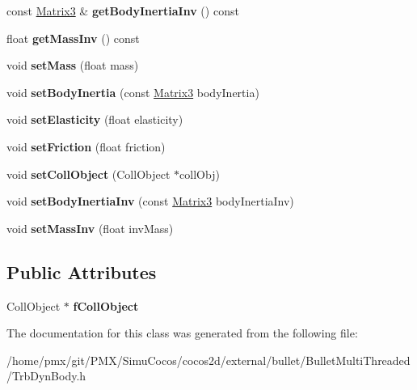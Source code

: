 \begin{DoxyCompactItemize}
const \hyperlink{classVectormath_1_1Aos_1_1Matrix3}{Matrix3} \& {\bfseries get\+Body\+Inertia\+Inv} () const
\item 
\mbox{\label{classTrbDynBody_a3fb3de1794f0085c11b98aefe4d7571e}} 
float {\bfseries get\+Mass\+Inv} () const
\item 
\mbox{\label{classTrbDynBody_a5676b47154e66a90eab40e00b5b69361}} 
void {\bfseries set\+Mass} (float mass)
\item 
\mbox{\label{classTrbDynBody_aa73a3217880970d4104f0a63dcfd1ad8}} 
void {\bfseries set\+Body\+Inertia} (const \hyperlink{classVectormath_1_1Aos_1_1Matrix3}{Matrix3} body\+Inertia)
\item 
\mbox{\label{classTrbDynBody_af48bbda40cb47f0b68dc5cb73b2e0b69}} 
void {\bfseries set\+Elasticity} (float elasticity)
\item 
\mbox{\label{classTrbDynBody_a3c27f2e9ae31167a57076e4c29bb0639}} 
void {\bfseries set\+Friction} (float friction)
\item 
\mbox{\label{classTrbDynBody_aac23aacc5358a75a0c23a7d07e9b1ba8}} 
void {\bfseries set\+Coll\+Object} (Coll\+Object $\ast$coll\+Obj)
\item 
\mbox{\label{classTrbDynBody_a22693d017bd96fb2b88b6600a9942574}} 
void {\bfseries set\+Body\+Inertia\+Inv} (const \hyperlink{classVectormath_1_1Aos_1_1Matrix3}{Matrix3} body\+Inertia\+Inv)
\item 
\mbox{\label{classTrbDynBody_a0e37f5368721b8a76dd8590fdb40fb10}} 
void {\bfseries set\+Mass\+Inv} (float inv\+Mass)
\end{DoxyCompactItemize}
\subsection*{Public Attributes}
\begin{DoxyCompactItemize}
\item 
\mbox{\label{classTrbDynBody_adf1fd1fb6c4625e4f64f8d01958a9d10}} 
Coll\+Object $\ast$ {\bfseries f\+Coll\+Object}
\end{DoxyCompactItemize}


The documentation for this class was generated from the following file\+:\begin{DoxyCompactItemize}
\item 
/home/pmx/git/\+P\+M\+X/\+Simu\+Cocos/cocos2d/external/bullet/\+Bullet\+Multi\+Threaded/Trb\+Dyn\+Body.\+h\end{DoxyCompactItemize}

